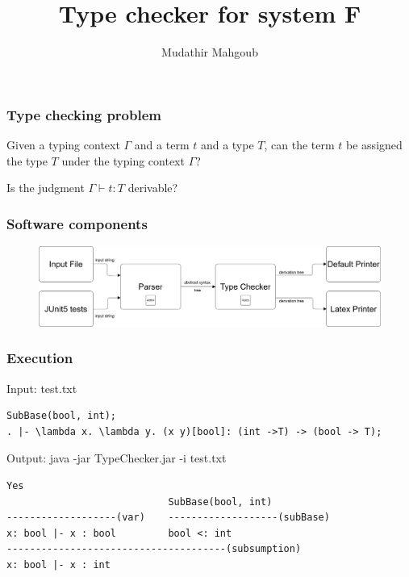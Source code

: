 \documentclass{beamer}
\title{Type checker for system F}
\author{Mudathir Mahgoub}
\begin{document}
 
\frame{\titlepage}
 
\begin{frame}
\frametitle{Type checking problem}

Given a typing context $\Gamma$ and  a term $t$ and a type $T$, can the term $t$ be assigned the type $T$ under the typing context $\Gamma$?

Is the judgment $\Gamma \vdash t: T$  derivable?
\end{frame}

\begin{frame}
\frametitle{Software components}
\begin{figure}
 \centering
 \includegraphics[scale=.18,keepaspectratio=true]{./typechecker.png}
\end{figure}
\end{frame}


\begin{frame}[fragile]
\frametitle{Execution}
\scriptsize

\begin{block}{Input: test.txt}
\begin{lstlisting}  
SubBase(bool, int);
. |- \lambda x. \lambda y. (x y)[bool]: (int ->T) -> (bool -> T);
\end{lstlisting}
\end{block}

\begin{block} {Output: java -jar TypeChecker.jar -i test.txt}
\begin{lstlisting}
Yes  
                        	SubBase(bool, int)	
-------------------(var)	-------------------(subBase)	
x: bool |- x : bool			bool <: int
--------------------------------------(subsumption)
x: bool |- x : int
\end{lstlisting}
\end{block}

\end{frame} 
\end{document}
